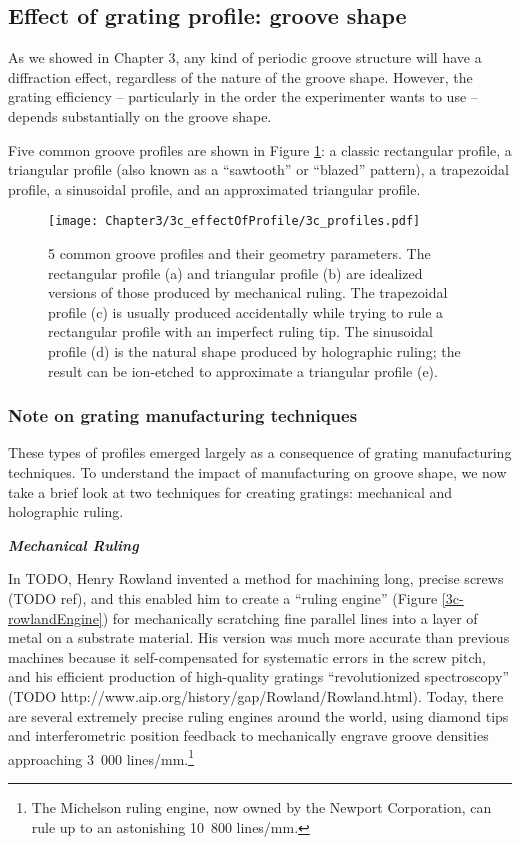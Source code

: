 \subsection{Effect of grating profile: groove shape}

As we showed in Chapter 3, any kind of periodic groove structure will have a diffraction effect, regardless of the nature of the groove shape.  However, the grating efficiency -- particularly in the order the experimenter wants to use -- depends substantially on the groove shape.  

Five common groove profiles are shown in Figure \ref{3c-profile}: a classic rectangular profile, a triangular profile (also known as a ``sawtooth'' or ``blazed'' pattern), a trapezoidal profile, a sinusoidal profile, and an approximated triangular profile.

\begin{figure}[htbp] %
   \centering
   \texttt{[image: Chapter3/3c\_effectOfProfile/3c\_profiles.pdf]}
   \caption{5 common groove profiles and their geometry parameters.  The rectangular profile (a) and triangular profile (b) are idealized versions of those produced by mechanical ruling.  The trapezoidal profile (c) is usually produced accidentally while trying to rule a rectangular profile with an imperfect ruling tip.  The sinusoidal profile (d) is the natural shape produced by holographic ruling; the result can be ion-etched to approximate a triangular profile (e).}
   \label{3c-profile}
\end{figure}

\subsubsection{Note on grating manufacturing techniques}
\label{gratingManufacturing}
These types of profiles emerged largely as a consequence of grating manufacturing techniques.  To understand the impact of manufacturing on groove shape, we now take a brief look at two techniques for creating gratings: mechanical and holographic ruling.

\noindent \textbf{\emph{Mechanical Ruling}}

\noindent In TODO, Henry Rowland invented a method for machining long, precise screws (TODO ref), and this enabled him to create a ``ruling engine'' (Figure \ref{3c-rowlandEngine}) for mechanically scratching fine parallel lines into a layer of metal on a substrate material.  His version was much more accurate than previous machines because it self-compensated for systematic errors in the screw pitch, and his efficient production of high-quality gratings ``revolutionized spectroscopy'' (TODO http://www.aip.org/history/gap/Rowland/Rowland.html).  Today, there are several extremely precise ruling engines around the world, using diamond tips and interferometric position feedback to mechanically engrave groove densities approaching 3~000 lines/mm.\footnote{The Michelson ruling engine, now owned by the Newport Corporation, can rule up to an astonishing 10~800 lines/mm.}

